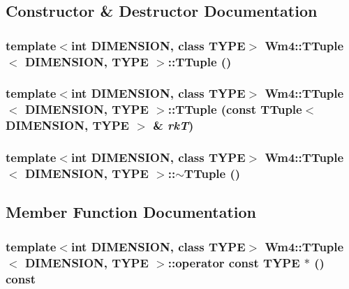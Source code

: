 \subsection{Constructor \& Destructor Documentation}
\subsubsection{\setlength{\rightskip}{0pt plus 5cm}template$<$int DIMENSION, class TYPE$>$ {\bf Wm4::TTuple}$<$ DIMENSION, TYPE $>$::{\bf TTuple} ()}\label{classWm4_1_1TTuple_5b043df7abee10c61293ca045af3b261}


\subsubsection{\setlength{\rightskip}{0pt plus 5cm}template$<$int DIMENSION, class TYPE$>$ {\bf Wm4::TTuple}$<$ DIMENSION, TYPE $>$::{\bf TTuple} (const {\bf TTuple}$<$ DIMENSION, TYPE $>$ \& {\em rk\-T})}\label{classWm4_1_1TTuple_560aa4608ca020c6e4cfb909230a5b71}


\subsubsection{\setlength{\rightskip}{0pt plus 5cm}template$<$int DIMENSION, class TYPE$>$ {\bf Wm4::TTuple}$<$ DIMENSION, TYPE $>$::$\sim${\bf TTuple} ()}\label{classWm4_1_1TTuple_d159f7bcd3df93b7699bc1fc9f827dd7}




\subsection{Member Function Documentation}
\subsubsection{\setlength{\rightskip}{0pt plus 5cm}template$<$int DIMENSION, class TYPE$>$ {\bf Wm4::TTuple}$<$ DIMENSION, TYPE $>$::operator const TYPE $\ast$ () const}\label{classWm4_1_1TTuple_2d99c029fedc1bb4d195507861930c11}


